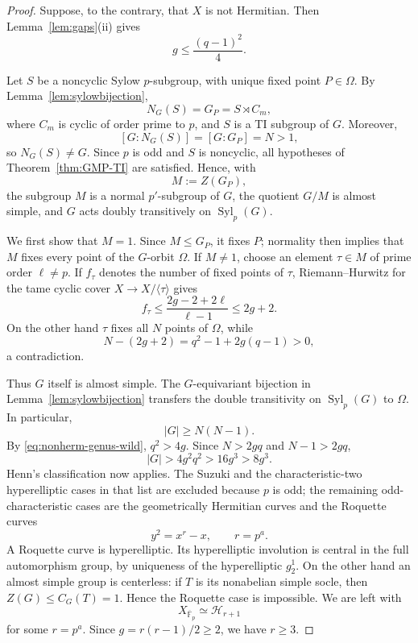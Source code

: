 \documentclass[11pt]{amsart}
\theoremstyle{remark}
\newcommand{\F}{\mathbb F}
\newcommand{\Syl}{\operatorname{Syl}}
\newcommand{\cH}{\mathcal H}
\begin{document}
\begin{proof}
Suppose, to the contrary, that $X$ is not Hermitian.  Then
Lemma~\ref{lem:gaps}(ii) gives
\begin{equation}\label{eq:nonherm-genus-wild}
          g\le\frac{(q-1)^2}{4}.
\end{equation}

Let $S$ be a noncyclic Sylow $p$-subgroup, with unique fixed point
$P\in\Omega$.  By Lemma~\ref{lem:sylowbijection},
\[
          N_G(S)=G_P=S\rtimes C_m,
\]
where $C_m$ is cyclic of order prime to $p$, and $S$ is a TI subgroup
of $G$.  Moreover,
\[
          [G:N_G(S)]=[G:G_P]=N>1,
\]
so $N_G(S)\ne G$.  Since $p$ is odd and $S$ is noncyclic, all hypotheses of
Theorem~\ref{thm:GMP-TI} are satisfied.  Hence, with
\[
          M:=Z(G_P),
\]
the subgroup $M$ is a normal $p'$-subgroup of $G$, the quotient $G/M$
is almost simple, and $G$ acts doubly transitively on $\Syl_p(G)$.

We first show that $M=1$.  Since $M\le G_P$, it fixes $P$; normality
then implies that $M$ fixes every point of the $G$-orbit $\Omega$.
If $M\ne1$, choose an element $\tau\in M$ of prime order
$\ell\ne p$.  If $f_\tau$ denotes the number of fixed points of
$\tau$, Riemann--Hurwitz for the tame cyclic cover
$X\to X/\langle\tau\rangle$ gives
\[
          f_\tau\le
          \frac{2g-2+2\ell}{\ell-1}
          \le 2g+2.
\]
On the other hand $\tau$ fixes all $N$ points of $\Omega$, while
\[
          N-(2g+2)=q^2-1+2g(q-1)>0,
\]
a contradiction.

Thus $G$ itself is almost simple.  The $G$-equivariant bijection in
Lemma~\ref{lem:sylowbijection} transfers the double transitivity on
$\Syl_p(G)$ to $\Omega$.  In particular,
\[
          |G|\ge N(N-1).
\]
By \eqref{eq:nonherm-genus-wild}, $q^2>4g$.  Since
$N>2gq$ and $N-1>2gq$,
\[
          |G|>4g^2q^2>16g^3>8g^3.
\]
Henn's classification \cite[Theorem~11.127]{HKT} now applies.  The
Suzuki and the characteristic-two hyperelliptic cases in that list are
excluded because $p$ is odd; the remaining odd-characteristic cases
are the geometrically Hermitian curves and the Roquette curves
\[
          y^2=x^r-x,\qquad r=p^a.
\]
A Roquette curve is hyperelliptic.  Its hyperelliptic involution is
central in the full automorphism group, by uniqueness of the
hyperelliptic $g^1_2$.  On the other hand an almost simple group is
centerless: if $T$ is its nonabelian simple socle, then
$Z(G)\le C_G(T)=1$.  Hence the Roquette case is impossible.  We are
left with
\[
          X_{\overline{\F}_p}\simeq\cH_{r+1}
\]
for some $r=p^a$.  Since $g=r(r-1)/2\ge2$, we have $r\ge3$.


\end{proof}
\end{document}
